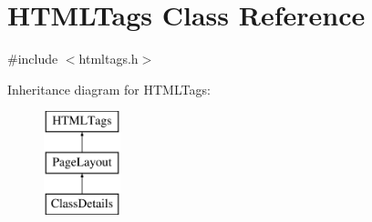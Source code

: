 \hypertarget{classHTMLTags}{\section{H\-T\-M\-L\-Tags Class Reference}
\label{classHTMLTags}
}


{\ttfamily \#include $<$htmltags.\-h$>$}

Inheritance diagram for H\-T\-M\-L\-Tags\-:\begin{figure}[H]
\begin{center}
\leavevmode
\includegraphics[height=3.000000cm]{classHTMLTags}
\end{center}
\end{figure}
